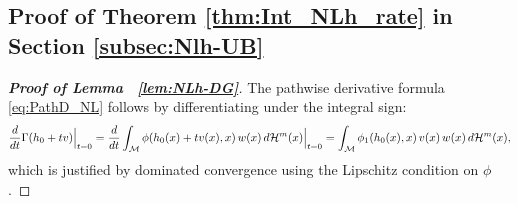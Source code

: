 \documentclass[12pt,american]{article}
\newcommand{\cH}{\mathcal{H}}
\theoremstyle{definition}
\theoremstyle{plain}
\theoremstyle{definition}
\theoremstyle{plain}
\theoremstyle{plain}
\theoremstyle{plain}
\theoremstyle{plain}
\theoremstyle{plain}
\begin{document}

\subsection{Proof of Theorem \ref{thm:Int_NLh_rate} in Section \ref{subsec:Nlh-UB}}

\begin{proof}[\textbf{Proof of Lemma ~\ref{lem:NLh-DG}}]
The pathwise derivative formula \eqref{eq:PathD_NL} follows by differentiating under the integral sign:
\[
\frac{d}{dt}\G(h_0 + tv)\Big|_{t=0} = \frac{d}{dt} \int_\cM \phi(h_0(x) + tv(x),x)\, w(x)\, d\cH^m(x)\Big|_{t=0} = \int_\cM \phi_1(h_0(x),x)\, v(x)\, w(x)\, d\cH^m(x),
\]
which is justified by dominated convergence using the Lipschitz condition on $\phi$.
\end{proof}
\end{document}

